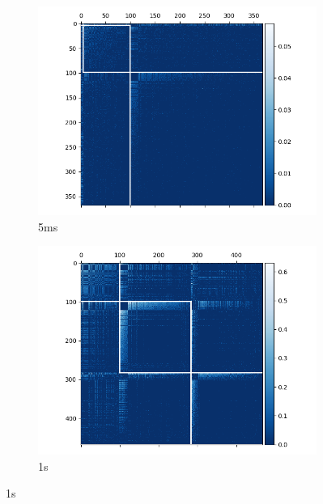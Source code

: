 \begin{figure}[p]
    \label{fig:absolute_consensus_clusterings_with_regions}
  \end{figure}

  \begin{figure}[p]
    \begin{subfigure}[h]{0.5\linewidth}
      \includegraphics[width=\linewidth]{figures/eight_probe/Krebs_0p005_negative_cons_cluster_map.png}
      \caption{5ms}
      \label{fig:negative_consensus_cluster_5ms}
    \end{subfigure}
    \begin{subfigure}[h]{0.5\linewidth}
      \includegraphics[width=\linewidth]{figures/eight_probe/Krebs_1p0_negative_cons_cluster_map.png}
      \caption{1s}
      \label{fig:negative_consensus_cluster_1s}

\end{subfigure}
\end{figure}
